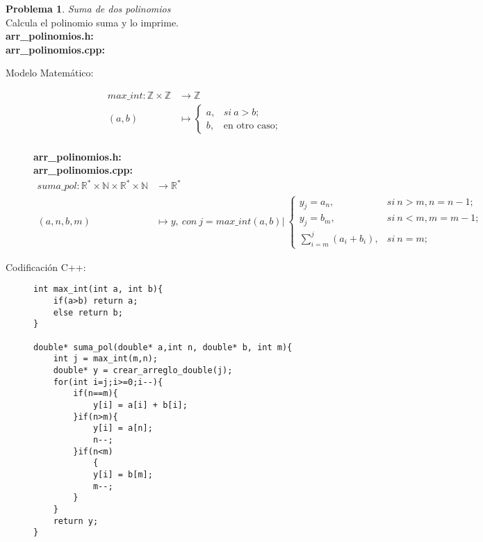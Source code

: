 \documentclass{article}
\theoremstyle{plain}
\theoremstyle{definition}
\newtheorem{problem}{Problema}
\begin{document}
\begin{problem} \emph{Suma de dos polinomios}\\
Calcula el polinomio suma y lo imprime.\\
\textbf{arr\_polinomios.h:}\ \\
\textbf{arr\_polinomios.cpp:}\ 
%
\begin{description}
\item[Modelo Matemático:]
%
\begin{align*}
max\_int: \mathbb{Z}\times\mathbb{Z} &\to \mathbb{Z}\\
(a,b) &\mapsto 
\begin{cases}
a,& si\ a>b;\\
b,& \text{en otro caso;}
\end{cases}
\end{align*}\\
\textbf{arr\_polinomios.h:}\ \\
\textbf{arr\_polinomios.cpp:}\ 
\begin{align*}
suma\_pol: \mathbb{R}^*\times\mathbb{N}\times\mathbb{R}^*\times\mathbb{N} &\to \mathbb{R}^*\\
(a,n,b,m) &\mapsto y,\ con\ j=max\_int(a,b)|\
\begin{cases}
y_j = a_n,& si\ n>m, n= n-1;\\
y_j = b_m,& si\ n<m, m= m-1;\\
\sum_{i=m}^{j}(a_i + b_i),& si\ n=m;
\end{cases}
\end{align*}
%
\item[Codificación \textsf{C++}:]\hfill
%
\begin{verbatim}
int max_int(int a, int b){
    if(a>b) return a;
    else return b;
}

double* suma_pol(double* a,int n, double* b, int m){
    int j = max_int(m,n);
    double* y = crear_arreglo_double(j);
    for(int i=j;i>=0;i--){
        if(n==m){
            y[i] = a[i] + b[i];
        }if(n>m){
            y[i] = a[n];
            n--;
        }if(n<m)
            {
            y[i] = b[m];
            m--;
        }
    }
    return y;
}
\end{verbatim}
\end{description}
\end{problem}
\end{document}
